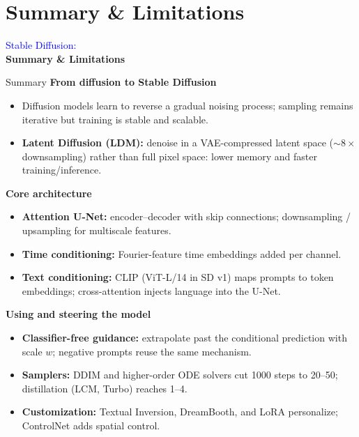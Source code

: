 \section{Summary \& Limitations}
\begin{frame}[plain]
    \centering
    \vspace{2cm}
    {\Huge \textcolor{blue}{Stable Diffusion:}\\[1em]
     \textbf{Summary \& Limitations}}
\end{frame}

\begin{frame}[allowframebreaks]{Summary}
  \textbf{From diffusion to Stable Diffusion}
  \begin{itemize}\itemsep0.35em
    \item Diffusion models learn to reverse a gradual noising process; sampling remains iterative but training is stable and scalable.
    \item \textbf{Latent Diffusion (LDM):} denoise in a VAE-compressed latent space ($\sim 8\times$ downsampling) rather than full pixel space: lower memory and faster training/inference.
  \end{itemize}

  \framebreak

  \textbf{Core architecture}
  \begin{itemize}\itemsep0.35em
    \item \textbf{Attention U-Net:} encoder--decoder with skip connections; downsampling / upsampling for multiscale features.
    \item \textbf{Time conditioning:} Fourier-feature time embeddings added per channel.
    \item \textbf{Text conditioning:} CLIP (ViT-L/14 in SD v1) maps prompts to token embeddings; cross-attention injects language into the U-Net.
  \end{itemize}

  \framebreak

  \textbf{Using and steering the model}
  \begin{itemize}\itemsep0.35em
    \item \textbf{Classifier-free guidance:} extrapolate past the conditional prediction with scale $w$; negative prompts reuse the same mechanism.
    \item \textbf{Samplers:} DDIM and higher-order ODE solvers cut 1000 steps to 20--50; distillation (LCM, Turbo) reaches 1--4.
    \item \textbf{Customization:} Textual Inversion, DreamBooth, and LoRA personalize; ControlNet adds spatial control.
  \end{itemize}


\end{frame}
